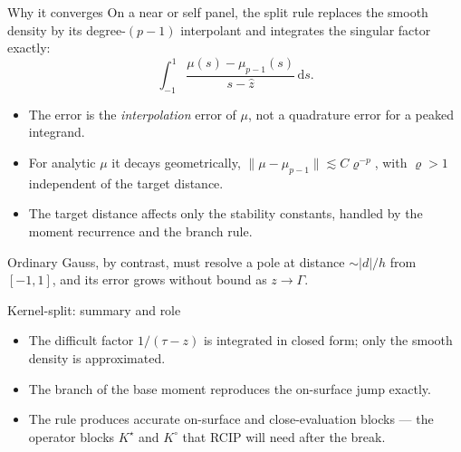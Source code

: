 \documentclass[aspectratio=169,11pt]{beamer}
\newcommand{\dd}{\,\mathrm d}
\begin{document}
\begin{frame}{Why it converges}
\small
On a near or self panel, the split rule replaces the smooth density by its
degree-$(p-1)$ interpolant and integrates the singular factor exactly:
\[
  \int_{-1}^1\frac{\mu(s)-\mu_{p-1}(s)}{s-\hat z}\dd s .
\]
\begin{itemize}
  \item The error is the \emph{interpolation} error of $\mu$, not a quadrature
  error for a peaked integrand.
  \item For analytic $\mu$ it decays geometrically, $\|\mu-\mu_{p-1}\|\lesssim
  C\varrho^{-p}$, with $\varrho>1$ independent of the target distance.
  \item The target distance affects only the stability constants, handled by the
  moment recurrence and the branch rule.
\end{itemize}
Ordinary Gauss, by contrast, must resolve a pole at distance $\sim|d|/h$ from
$[-1,1]$, and its error grows without bound as $z\to\Gamma$.
\end{frame}

\begin{frame}{Kernel-split: summary and role}
\small
\begin{center}
\end{center}

\vspace{1mm}
\begin{itemize}
  \item The difficult factor $1/(\tau-z)$ is integrated in closed form; only the
  smooth density is approximated.
  \item The branch of the base moment reproduces the on-surface jump exactly.
  \item The rule produces accurate on-surface and close-evaluation blocks --- the
  operator blocks $K^\star$ and $K^\circ$ that RCIP will need after the break.
\end{itemize}
\end{frame}
\end{document}
